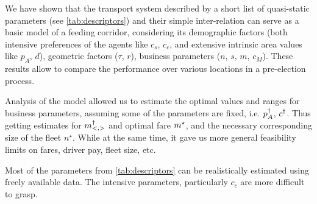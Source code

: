 \documentclass[a4paper]{report}
\begin{document}
We have shown that the transport system described by a short list of quasi-static parameters (see \autoref{tab:descriptors}) and their simple inter-relation  can serve as a basic model of a feeding corridor, considering its demographic factors (both intensive preferences of the agents like $c_s$, $c_c$, and extensive intrinsic area values like $p_A$, $d$), geometric factors ($\tau$, $r$), business parameters ($n$, $s$, $m$, $c_M$). These results allow to compare the performance over various locations in a pre-election process.

Analysis of the model allowed us to estimate the optimal values and ranges for business parameters, assuming some of the parameters are fixed, i.e. $p_A^{\dagger}$, $c^{\dagger}$. Thus getting estimates for $m^{\dagger}_{<,>}$ and optimal fare $m^{\star}$, and the necessary corresponding size of the fleet $n^{\star}$. While at the same time, it gave us more general feasibility limits on fares, driver pay, fleet size, etc.

Most of the parameters from \autoref{tab:descriptors} can be realistically estimated using freely available data. The intensive parameters, particularly $c_c$ are more difficult to grasp.
\end{document}
